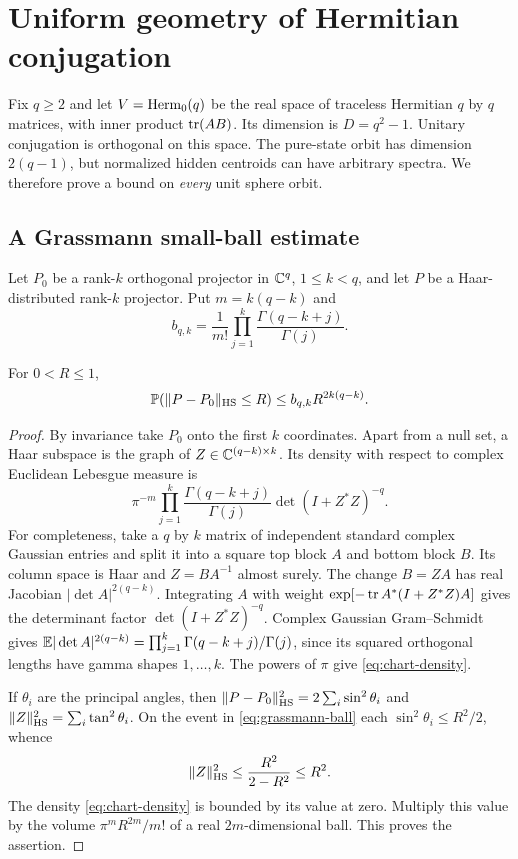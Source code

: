 \section{Uniform geometry of Hermitian conjugation}\label{sec:conjugation}
Fix $q\ge2$ and let $V=\operatorname{Herm}_0(q)$ be the real space of traceless
Hermitian $q$ by $q$ matrices, with inner product $\operatorname{tr}(AB)$. Its dimension
is $D=q^2-1$. Unitary conjugation is orthogonal on this space.
The pure-state orbit has dimension $2(q-1)$, but normalized hidden
centroids can have arbitrary spectra. We therefore prove a bound on
\emph{every} unit sphere orbit.

\subsection{A Grassmann small-ball estimate}
Let $P_0$ be a rank-$k$ orthogonal projector in $\mathbb C^q$, $1\le k<q$,
and let $P$ be a Haar-distributed rank-$k$ projector. Put
$m=k(q-k)$ and
\begin{equation}\label{eq:grassmann-constant}
 b_{q,k}=\frac1{m!}\prod_{j=1}^k\frac{\Gamma(q-k+j)}{\Gamma(j)}.
\end{equation}
\begin{lemma}\label{lem:grassmann}
For $0<R\le1$,
\begin{equation}\label{eq:grassmann-ball}
 \mathbb P(\lVert P-P_0\rVert_{\mathrm{HS}}\le R)\le b_{q,k}R^{2k(q-k)}.
\end{equation}
\end{lemma}
\begin{proof}
By invariance take $P_0$ onto the first $k$ coordinates. Apart from a
null set, a Haar subspace is the graph of
$Z\in\mathbb C^{(q-k)\times k}$. Its density with respect to complex Euclidean
Lebesgue measure is
\begin{equation}\label{eq:chart-density}
 \pi^{-m}\prod_{j=1}^k\frac{\Gamma(q-k+j)}{\Gamma(j)}
             \det(I+Z^*Z)^{-q}.
\end{equation}
For completeness, take a $q$ by $k$ matrix of independent standard
complex Gaussian entries and split it into a square top block $A$ and
bottom block $B$. Its column space is Haar and $Z=BA^{-1}$ almost surely.
The change $B=ZA$ has real Jacobian $|\det A|^{2(q-k)}$.
Integrating $A$ with weight
$\exp[-\operatorname{tr} A^*(I+Z^*Z)A]$ gives the determinant factor $\det(I+Z^*Z)^{-q}$.
Complex Gaussian Gram--Schmidt gives
$\mathbb E|\det A|^{2(q-k)}=\prod_{j=1}^k\Gamma(q-k+j)/\Gamma(j)$,
since its squared orthogonal lengths have gamma shapes $1,\ldots,k$.
The powers of $\pi$ give \eqref{eq:chart-density}.

If $\theta_i$ are the principal angles, then
$\lVert P-P_0\rVert_{\mathrm{HS}}^2=2\sum_i\sin^2\theta_i$ and
$\lVert Z\rVert_{\mathrm{HS}}^2=\sum_i\tan^2\theta_i$. On the event in
\eqref{eq:grassmann-ball} each $\sin^2\theta_i\le R^2/2$, whence
\[
 \lVert Z\rVert_{\mathrm{HS}}^2\le\frac{R^2}{2-R^2}\le R^2.
\]
The density \eqref{eq:chart-density} is bounded by its value at zero.
Multiply this value by the volume $\pi^m R^{2m}/m!$ of a real
$2m$-dimensional ball. This proves the assertion.
\end{proof}

